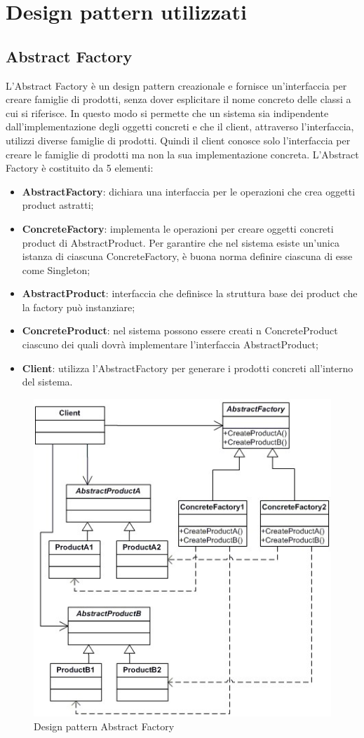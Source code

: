 \newpage
\section{Design pattern utilizzati}


\subsection{Abstract Factory}
L'Abstract Factory è un design pattern creazionale e fornisce un'interfaccia per creare famiglie di prodotti, senza dover esplicitare il nome concreto delle classi a cui si riferisce. In questo modo si permette che un sistema sia indipendente dall'implementazione degli oggetti concreti e che il client, attraverso l'interfaccia, utilizzi diverse famiglie di prodotti. Quindi il client conosce solo l’interfaccia per creare le famiglie di prodotti ma non la sua implementazione concreta.
L’Abstract Factory è costituito da 5 elementi:
\begin{itemize}
	\item \textbf{AbstractFactory}: dichiara una interfaccia per le operazioni che crea oggetti product astratti;
	\item \textbf{ConcreteFactory}: implementa le operazioni per creare oggetti concreti product di AbstractProduct. Per garantire che nel sistema esiste un’unica istanza di ciascuna ConcreteFactory, è buona norma definire ciascuna di esse come Singleton;
	\item \textbf{AbstractProduct}: interfaccia che definisce la struttura base dei product che la factory può instanziare;
	\item \textbf{ConcreteProduct}: nel sistema possono essere creati n ConcreteProduct ciascuno dei quali dovrà implementare l’interfaccia AbstractProduct;
	\item \textbf{Client}: utilizza l’AbstractFactory per generare i prodotti concreti all’interno del sistema.
\end{itemize}

\begin{figure}[h]
	\centering
	\includegraphics[width=0.5\linewidth]{IMG/abstract-pattern}
	\caption{Design pattern Abstract Factory}
	\label{fig:abstract-pattern}
\end{figure}


